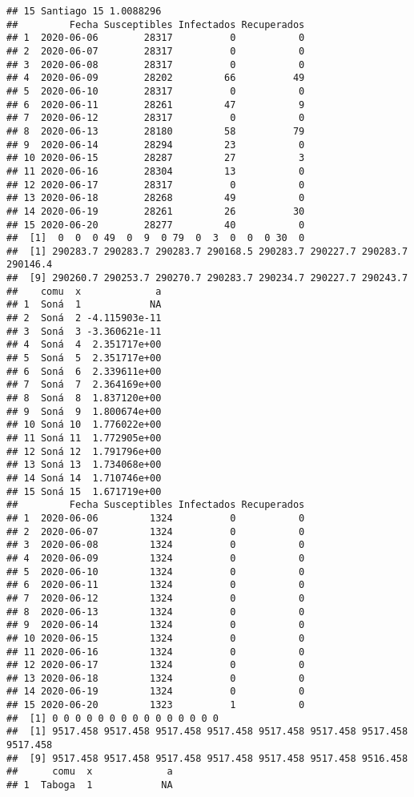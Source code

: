 \documentclass[
]{article}
\begin{document}
\begin{verbatim}
## 15 Santiago 15 1.0088296
##         Fecha Susceptibles Infectados Recuperados
## 1  2020-06-06        28317          0           0
## 2  2020-06-07        28317          0           0
## 3  2020-06-08        28317          0           0
## 4  2020-06-09        28202         66          49
## 5  2020-06-10        28317          0           0
## 6  2020-06-11        28261         47           9
## 7  2020-06-12        28317          0           0
## 8  2020-06-13        28180         58          79
## 9  2020-06-14        28294         23           0
## 10 2020-06-15        28287         27           3
## 11 2020-06-16        28304         13           0
## 12 2020-06-17        28317          0           0
## 13 2020-06-18        28268         49           0
## 14 2020-06-19        28261         26          30
## 15 2020-06-20        28277         40           0
##  [1]  0  0  0 49  0  9  0 79  0  3  0  0  0 30  0
##  [1] 290283.7 290283.7 290283.7 290168.5 290283.7 290227.7 290283.7 290146.4
##  [9] 290260.7 290253.7 290270.7 290283.7 290234.7 290227.7 290243.7
##    comu  x             a
## 1  Soná  1            NA
## 2  Soná  2 -4.115903e-11
## 3  Soná  3 -3.360621e-11
## 4  Soná  4  2.351717e+00
## 5  Soná  5  2.351717e+00
## 6  Soná  6  2.339611e+00
## 7  Soná  7  2.364169e+00
## 8  Soná  8  1.837120e+00
## 9  Soná  9  1.800674e+00
## 10 Soná 10  1.776022e+00
## 11 Soná 11  1.772905e+00
## 12 Soná 12  1.791796e+00
## 13 Soná 13  1.734068e+00
## 14 Soná 14  1.710746e+00
## 15 Soná 15  1.671719e+00
##         Fecha Susceptibles Infectados Recuperados
## 1  2020-06-06         1324          0           0
## 2  2020-06-07         1324          0           0
## 3  2020-06-08         1324          0           0
## 4  2020-06-09         1324          0           0
## 5  2020-06-10         1324          0           0
## 6  2020-06-11         1324          0           0
## 7  2020-06-12         1324          0           0
## 8  2020-06-13         1324          0           0
## 9  2020-06-14         1324          0           0
## 10 2020-06-15         1324          0           0
## 11 2020-06-16         1324          0           0
## 12 2020-06-17         1324          0           0
## 13 2020-06-18         1324          0           0
## 14 2020-06-19         1324          0           0
## 15 2020-06-20         1323          1           0
##  [1] 0 0 0 0 0 0 0 0 0 0 0 0 0 0 0
##  [1] 9517.458 9517.458 9517.458 9517.458 9517.458 9517.458 9517.458 9517.458
##  [9] 9517.458 9517.458 9517.458 9517.458 9517.458 9517.458 9516.458
##      comu  x             a
## 1  Taboga  1            NA

\end{verbatim}
\end{document}
